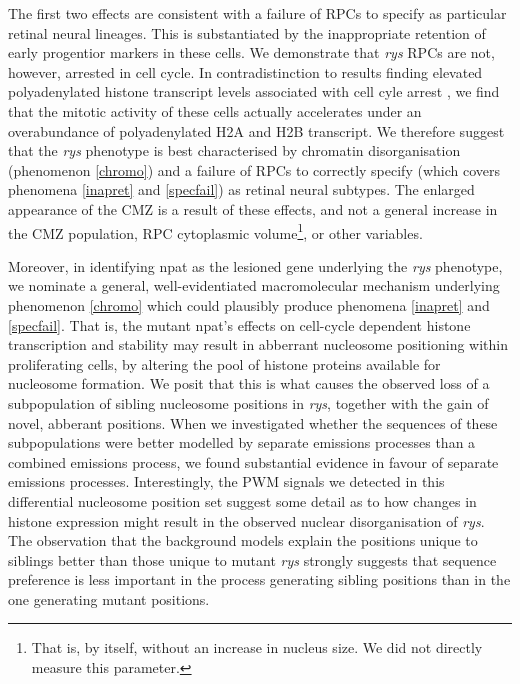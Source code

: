 The first two effects are consistent with a failure of RPCs to specify as particular retinal neural lineages. This is substantiated by the inappropriate retention of early progentior markers in these cells. We demonstrate that \textit{rys} RPCs are not, however, arrested in cell cycle. In contradistinction to results finding elevated polyadenylated histone transcript levels associated with cell cyle arrest \cite{Kari2013}, we find that the mitotic activity of these cells actually accelerates under an overabundance of polyadenylated H2A and H2B transcript. We therefore suggest that the \textit{rys} phenotype is best characterised by chromatin disorganisation (phenomenon \ref{chromo}) and a failure of RPCs to correctly specify (which covers phenomena \ref{inapret} and \ref{specfail}) as retinal neural subtypes. The enlarged appearance of the CMZ is a result of these effects, and not a general increase in the CMZ population, RPC cytoplasmic volume\footnote{That is, by itself, without an increase in nucleus size. We did not directly measure this parameter.}, or other variables. 

Moreover, in identifying npat as the lesioned gene underlying the \textit{rys} phenotype, we nominate a general, well-evidentiated macromolecular mechanism underlying phenomenon \ref{chromo} which could plausibly produce phenomena \ref{inapret} and \ref{specfail}. That is, the mutant npat's effects on cell-cycle dependent histone transcription and stability may result in abberrant nucleosome positioning within proliferating cells, by altering the pool of histone proteins available for nucleosome formation. We posit that this is what causes the observed loss of a subpopulation of sibling nucleosome positions in \textit{rys}, together with the gain of novel, abberant positions. When we investigated whether the sequences of these subpopulations were better modelled by separate emissions processes than a combined emissions process, we found substantial evidence in favour of separate emissions processes. Interestingly, the PWM signals we detected in this differential nucleosome position set suggest some detail as to how changes in histone expression might result in the observed nuclear disorganisation of \textit{rys}. The observation that the background models explain the positions unique to siblings better than those unique to mutant \textit{rys} strongly suggests that sequence preference is less important in the process generating sibling positions than in the one generating mutant positions.

